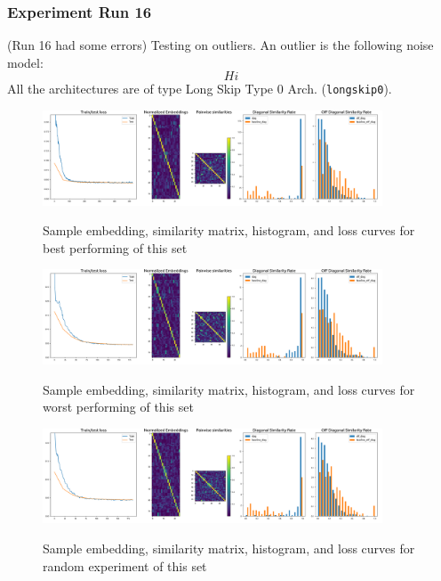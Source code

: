 \documentclass[a4paper]{article}
\begin{document}
\subsubsection*{Experiment Run 16}
(Run 16 had some errors)
Testing on outliers. An outlier is the following noise model:
\begin{equation*}
Hi
\end{equation*}
All the architectures are of type Long Skip Type 0 Arch. (\texttt{longskip0}).

\begin{figure}[H]
  \includegraphics[width=0.9\textwidth]{figures/outlier1-longskip0-load-false-1}
  \label{fig:outlier1-longskip0-load-false-1-sub1}
  \caption{Sample embedding, similarity matrix, histogram, and loss curves for best performing of this set}
\end{figure}
\begin{figure}[H]
  \includegraphics[width=0.9\textwidth]{figures/outlier8-longskip0-load-false-0}
  \label{fig:outlier8-longskip0-load-false-0-sub1}
  \caption{Sample embedding, similarity matrix, histogram, and loss curves for worst performing of this set}
\end{figure}
\begin{figure}[H]
  \includegraphics[width=0.9\textwidth]{figures/outlier2-longskip0-load-false-1}
  \label{fig:outlier2-longskip0-load-false-1-sub1}
  \caption{Sample embedding, similarity matrix, histogram, and loss curves for random experiment of this set}
\end{figure}
\end{document}
